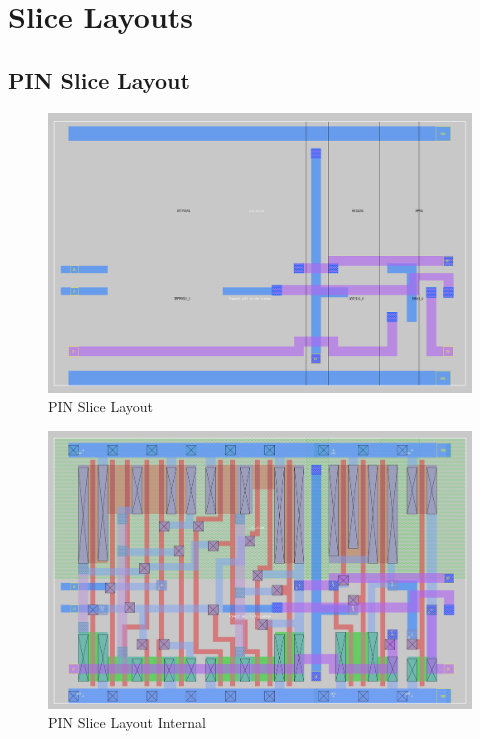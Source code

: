 \section{Slice Layouts}
    \subsection{PIN Slice Layout}
        \begin{figure}[H]
            \centering
            \includegraphics[width=0.75\linewidth]{../../magic/images/pin_slice.png}
            \caption{PIN Slice Layout}
        \end{figure}
        \begin{figure}[H]
            \centering
            \includegraphics[width=0.75\linewidth]{../../magic/images/pin_slice_internal.png}
            \caption{PIN Slice Layout Internal}
        \end{figure}
